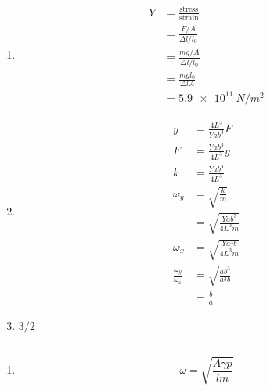 \documentclass{article}
\begin{document}
\subsection{}

\begin{enumerate}
  \item

        \begin{align*}
          Y & = \frac{\text{stress}}{\text{strain}} \\
            & = \frac{F / A}{\Delta l / l_0}        \\
            & = \frac{m g / A}{\Delta l / l_0}      \\
            & = \frac{m g l_0}{\Delta l A}          \\
            & = \qty{5.9e11}{N/m^2}
        \end{align*}

  \item

        \begin{align*}
          y                         & = \frac{4 L^3}{Y a b^3} F        \\
          F                         & = \frac{Y a b^3}{4 L^3} y        \\
          k                         & = \frac{Y a b^3}{4 L^3}          \\
          \omega_y                  & = \sqrt{\frac{k}{m}}             \\
                                    & = \sqrt{\frac{Y a b^3}{4 L^3 m}} \\
          \omega_x                  & = \sqrt{\frac{Y a^3 b}{4 L^3 m}} \\
          \frac{\omega_y}{\omega_x} & = \sqrt{\frac{a b^3}{a^3 b}}     \\
                                    & = \frac{b}{a}
        \end{align*}

  \item $3 / 2$
\end{enumerate}

\subsection{}

\begin{enumerate}
  \item \[\omega = \sqrt{\frac{A \gamma p}{l m}}\]
\end{enumerate}
\end{document}

